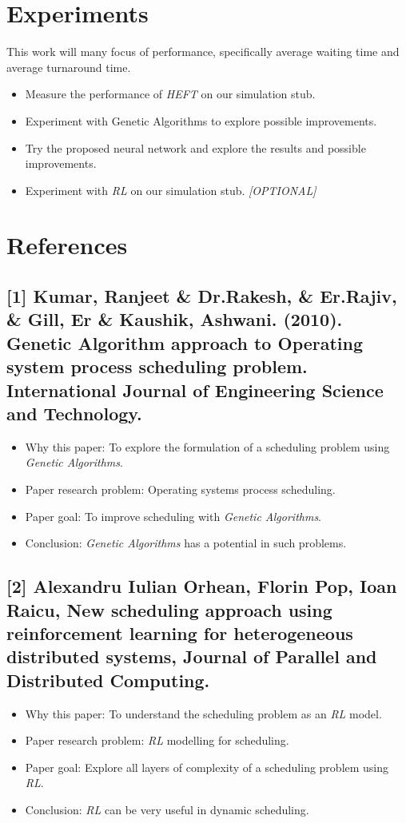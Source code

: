 \documentclass[twocolumn,11pt]{IEEEtran}
\begin{document}
    \section{Experiments}
    This work will many focus of performance, specifically average waiting time and average turnaround time. 
    \begin{itemize}
        \item Measure the performance of \emph{HEFT} on our simulation stub.
        \item Experiment with Genetic Algorithms to explore possible improvements.
        \item Try the proposed neural network and explore the results and possible improvements.
        \item Experiment with \emph{RL} on our simulation stub. \emph{[OPTIONAL]}
    \end{itemize}
    
    \section{References}
    \subsection*{[1] Kumar, Ranjeet \& Dr.Rakesh, \& Er.Rajiv, \& Gill, Er \& Kaushik, Ashwani. (2010). Genetic Algorithm approach to Operating system process scheduling problem. International Journal of Engineering Science and Technology.}
    \begin{itemize}
        \item Why this paper: To explore the formulation of a scheduling problem using \emph{Genetic Algorithms}.
        \item Paper research problem: Operating systems process scheduling.
        \item Paper goal: To improve scheduling with \emph{Genetic Algorithms}.
        \item Conclusion: \emph{Genetic Algorithms} has a potential in such problems.
    \end{itemize} 
    
     \subsection*{[2] Alexandru Iulian Orhean, Florin Pop, Ioan Raicu,
    New scheduling approach using reinforcement learning for heterogeneous distributed systems,
    Journal of Parallel and Distributed Computing.}
    \begin{itemize}
        \item Why this paper: To understand the scheduling problem as an \emph{RL} model.
        \item Paper research problem: \emph{RL} modelling for scheduling.
        \item Paper goal: Explore all layers of complexity of a scheduling problem using \emph{RL}.
        \item Conclusion: \emph{RL} can be very useful in dynamic scheduling.
    \end{itemize} 
    
\end{document}
